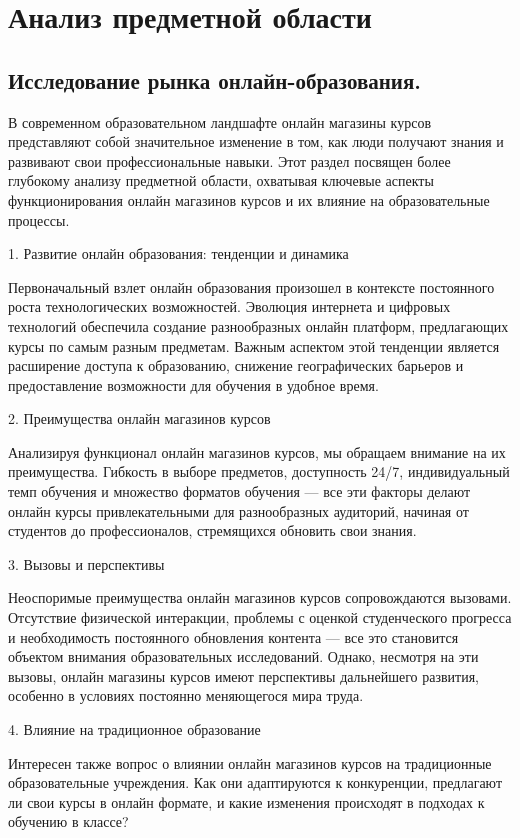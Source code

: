 \section{Анализ предметной области}
\subsection{Исследование рынка онлайн-образования.}

В современном образовательном ландшафте онлайн магазины курсов представляют собой значительное изменение в том, как люди получают знания и развивают свои профессиональные навыки. Этот раздел посвящен более глубокому анализу предметной области, охватывая ключевые аспекты функционирования онлайн магазинов курсов и их влияние на образовательные процессы.

1. Развитие онлайн образования: тенденции и динамика

Первоначальный взлет онлайн образования произошел в контексте постоянного роста технологических возможностей. Эволюция интернета и цифровых технологий обеспечила создание разнообразных онлайн платформ, предлагающих курсы по самым разным предметам. Важным аспектом этой тенденции является расширение доступа к образованию, снижение географических барьеров и предоставление возможности для обучения в удобное время.

2. Преимущества онлайн магазинов курсов

Анализируя функционал онлайн магазинов курсов, мы обращаем внимание на их преимущества. Гибкость в выборе предметов, доступность 24/7, индивидуальный темп обучения и множество форматов обучения — все эти факторы делают онлайн курсы привлекательными для разнообразных аудиторий, начиная от студентов до профессионалов, стремящихся обновить свои знания.

3. Вызовы и перспективы

Неоспоримые преимущества онлайн магазинов курсов сопровождаются вызовами. Отсутствие физической интеракции, проблемы с оценкой студенческого прогресса и необходимость постоянного обновления контента — все это становится объектом внимания образовательных исследований. Однако, несмотря на эти вызовы, онлайн магазины курсов имеют перспективы дальнейшего развития, особенно в условиях постоянно меняющегося мира труда.

4. Влияние на традиционное образование

Интересен также вопрос о влиянии онлайн магазинов курсов на традиционные образовательные учреждения. Как они адаптируются к конкуренции, предлагают ли свои курсы в онлайн формате, и какие изменения происходят в подходах к обучению в классе?

